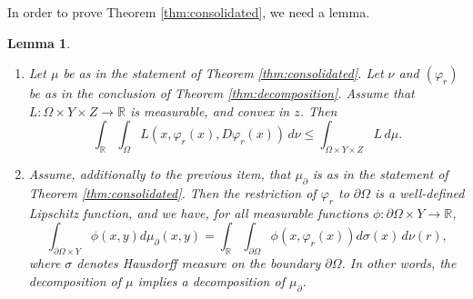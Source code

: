 \documentclass{article}
\newcommand{\R}{\mathbb{R}}
\newtheorem{lemma}[theorem]{Lemma}
\theoremstyle{definition}
\theoremstyle{remark}
\begin{document}
In order to prove Theorem \ref{thm:consolidated}, we need a lemma.

%
%
%
%

\begin{lemma}\label{lem:jensenlemma}
\begin{enumerate}[label=\roman*.,ref=(\roman*)]
    \item \label{it:insideomega}Let $\mu$ be as in the statement of Theorem \ref{thm:consolidated}. Let $\nu$ and $(\varphi_r)$ be as in the conclusion of Theorem \ref{thm:decomposition}. Assume that $L\colon\Omega\times Y\times Z\to\R$ is measurable, and convex in $z$. Then
    \[\int_{\R}\int_\Omega L(x,\varphi_r(x),D\varphi_r(x))\,d\nu\leq \int_{\Omega\times Y\times Z}L\,d\mu.\]
    \item \label{it:boundary} Assume, additionally to the previous item, that $\mu_\partial$ is as in the statement of Theorem \ref{thm:consolidated}. Then the restriction of $\varphi_r$ to $\partial\Omega$ is a well-defined Lipschitz function, and we have, for all measurable functions $\phi\colon\partial\Omega\times Y\to\R$,
    \[\int_{\partial\Omega\times Y}\phi(x,y) d\mu_\partial(x,y)=\int_{\R}\int_{\partial\Omega}\phi(x,\varphi_r(x))d\sigma(x)\,d\nu(r),\]
    where $\sigma$ denotes Hausdorff measure on the boundary $\partial \Omega$.
     In other words, the decomposition of $\mu$ implies a decomposition of $\mu_\partial$. 
\end{enumerate}
\end{lemma}
\end{document}
